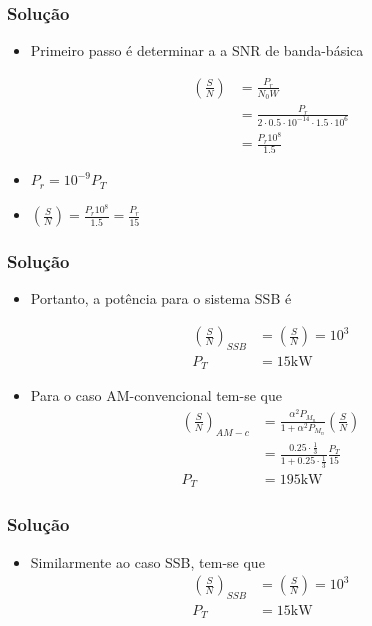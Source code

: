 \documentclass[aspectratio=169,dvipsnames]{beamer}
\begin{document}
\begin{frame}
  \frametitle{Solução}

  \begin{itemize}
    \item Primeiro passo é determinar a a SNR de banda-básica

    \begin{align*}
      \left(\frac{S}{N}\right) & = \frac{P_r}{N_0W} \\
      & = \frac{P_r}{2\cdot 0.5 \cdot 10^{-14} \cdot 1.5 \cdot 10^6} \\
      & = \frac{P_r10^8}{1.5}
    \end{align*}

    \item $P_r = 10^{-9}P_T$ 
    \item $\left(\frac{S}{N}\right) = \frac{P_r10^8}{1.5} = \frac{P_r}{15}$
  \end{itemize}

\end{frame}


\begin{frame}
  \frametitle{Solução}

  \begin{itemize}

    \item Portanto, a potência para o sistema SSB é

  \begin{align*}
    \left(\frac{S}{N}\right)_{SSB}  &= \left(\frac{S}{N}\right) = 10^3 \\
    P_T &= 15 \si{\kilo\watt}
  \end{align*}

  
    \item Para o caso AM-convencional tem-se que 
    \begin{align*}
      \left(\frac{S}{N}\right)_{AM-c} &= \frac{\alpha ^2 P_{M_n}}{1+\alpha ^2 P_{M_n}}\left(\frac{S}{N}\right) \\
      &=\frac{0.25 \cdot \frac{1}{3}}{1 + 0.25 \cdot \frac{1}{3}} \frac{P_T}{15} \\
      P_T& =195 \si{\kilo\watt}
    \end{align*}
  \end{itemize}
 
\end{frame}


\begin{frame}
  \frametitle{Solução}

  \begin{itemize}
    \item Similarmente ao caso SSB, tem-se que 
    \begin{align*}
      \left(\frac{S}{N}\right)_{SSB}  &= \left(\frac{S}{N}\right) = 10^3 \\
      P_T &= 15\si{\kilo\watt}
    \end{align*} 
  \end{itemize}  

\end{frame}
\end{document}
